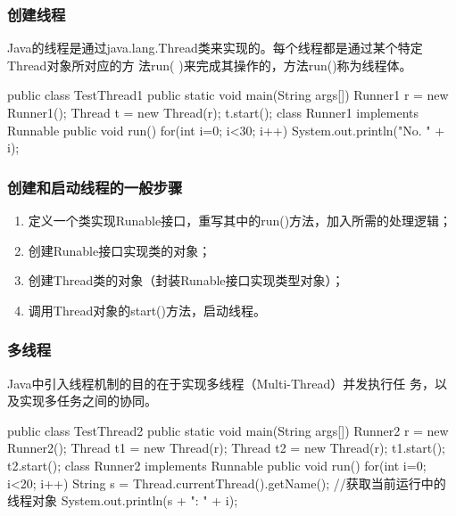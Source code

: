 \begin{frame}[fragile] %
\frametitle{创建线程}

Java的线程是通过java.lang.Thread类来实现的。每个线程都是通过某个特定Thread对象所对应的方
法run( )来完成其操作的，方法run()称为线程体。

\begin{javaCode}
public class TestThread1 {
  public static void main(String args[]) {
    Runner1 r = new Runner1();
    Thread t = new Thread(r);
    t.start();
  }
}
class Runner1 implements Runnable {
  public void run() {
    for(int i=0; i<30; i++) {
      System.out.println("No. " + i);
    }
  }
}
\end{javaCode}
\end{frame}

\begin{frame}[fragile] %
\frametitle{创建和启动线程的一般步骤}
\begin{enumerate}
\item 定义一个类实现Runable接口，重写其中的run()方法，加入所需的处理逻辑；
\item 创建Runable接口实现类的对象；
\item 创建Thread类的对象（封装Runable接口实现类型对象）；
\item 调用Thread对象的start()方法，启动线程。
\end{enumerate}
\end{frame}

\begin{frame}[fragile] %
\frametitle{多线程}

Java中引入线程机制的目的在于实现{\hei 多线程（Multi-Thread）并发执行任
  务，以及实现多任务之间的协同}。
\begin{javaCode}
public class TestThread2 {
  public static void main(String args[]) {
    Runner2 r = new Runner2();
    Thread t1 = new Thread(r);
    Thread t2 = new Thread(r);
    t1.start();
    t2.start();
  }
}
class Runner2 implements Runnable {
  public void run() {
    for(int i=0; i<20; i++) {
      String s = Thread.currentThread().getName(); //获取当前运行中的线程对象
      System.out.println(s + ": " + i);
    }
  }
}
\end{javaCode}
\end{frame}


